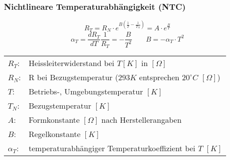 \newpage
\subsubsection{Nichtlineare Temperaturabhängigkeit (NTC)}
\[ R_T = R_N \cdot e^{B\left(\frac{1}{T} - \frac{1}{T_N}\right)} 
= A \cdot e^{\frac{B}{T}} \]
\[ \alpha_T = \frac{d R_T}{d T}\frac{1}{R_T} = -\frac{B}{T^2} 
\qquad B = -\alpha_T \cdot T^2 \]
\begin{tabular}{@{}lp{}}
  $R_T$:        & Heissleiterwiderstand bei $T[K]$ in $[\Omega]$ \\
  $R_N$:        & R bei Bezugstemperatur 
                  ($293 K$ entsprechen $20^\circ C$ $[\Omega]$) \\
  $T$:          & Betriebs-, Umgebungstemperatur $[K]$ \\
  $T_N$:        & Bezugstemperatur $[K]$ \\
  $A$:          & Formkonstante $[\Omega]$ nach Herstellerangaben \\
  $B$:          & Regelkonstante $[K]$ \\
  $\alpha_T$:   & temperaturabhängiger Temperaturkoeffizient bei $T$ $[K]$
\end{tabular}